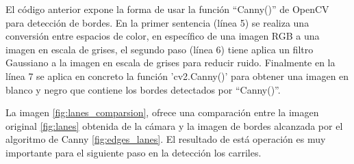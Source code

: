 El código anterior expone la forma de usar la función ``Canny()'' de OpenCV para detección de bordes. En la primer sentencia (línea 5) se realiza una conversión entre espacios de color, en específico de una imagen RGB a una imagen en escala de grises, el segundo paso (línea 6) tiene aplica un filtro Gaussiano a la imagen en escala de grises para reducir ruido. Finalmente en la línea 7 se aplica en concreto la función 'cv2.Canny()' para obtener una imagen en blanco y negro que contiene los bordes detectados por ``Canny()''.

La imagen \ref{fig:lanes_comparsion}, ofrece una comparación entre la imagen original \ref{fig:lanes} obtenida de la cámara y la imagen de bordes alcanzada por el algoritmo de Canny \ref{fig:edges_lanes}. El resultado de está operación es muy importante para el siguiente paso en la detección los carriles.
